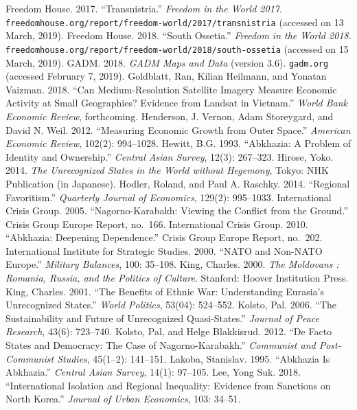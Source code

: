 \documentclass[12pt,a4paper]{article}%
\begin{document}
\begin{thebibliography}{99}
\bibitem{} Freedom House. 2017. ``Transnistria.'' \textit{Freedom in the World 2017}. \verb!freedomhouse.org/report/freedom-world/2017/transnistria! (accessed on 13 March, 2019).
\bibitem{} Freedom House. 2018. ``South Ossetia.'' \textit{Freedom in the World 2018}. \verb!freedomhouse.org/report/freedom-world/2018/south-ossetia! (accessed on 15 March, 2019).
\bibitem{} GADM. 2018. \textit{GADM Maps and Data} (version 3.6). \verb!gadm.org! (accessed February 7, 2019).
\bibitem{} Goldblatt, Ran, Kilian Heilmann, and Yonatan Vaizman. 2018. ``Can Medium-Resolution Satellite Imagery Measure Economic Activity at Small Geographies? Evidence from Landsat in Vietnam.'' \textit{World Bank Economic Review}, forthcoming.
\bibitem{} Henderson, J. Vernon, Adam Storeygard, and David N. Weil. 2012. ``Measuring Economic Growth from Outer Space.'' \textit{American Economic Review}, 102(2): 994--1028.
\bibitem{} Hewitt, B.G. 1993. ``Abkhazia: A Problem of Identity and Ownership.'' \textit{Central Asian Survey}, 12(3): 267--323.
\bibitem{} Hirose, Yoko. 2014. \textit{The Unrecognized States in the World without Hegemony}, Tokyo: NHK Publication (in Japanese). 
\bibitem{} Hodler, Roland, and Paul A. Raschky. 2014. ``Regional Favoritism.'' \textit{Quarterly Journal of Economics}, 129(2): 995--1033.
\bibitem{} International Crisis Group. 2005. ``Nagorno-Karabakh: Viewing the Conflict from the Ground.'' Crisis Group Europe Report, no.\ 166.
\bibitem{} International Crisis Group. 2010. ``Abkhazia: Deepening Dependence.'' Crisis Group Europe Report, no.\ 202. 
\bibitem{} International Institute for Strategic Studies. 2000. ``NATO and Non-NATO Europe.'' \textit{Military Balances}, 100: 35--108.
\bibitem{} King, Charles. 2000. \textit{The Moldovans : Romania, Russia, and the Politics of Culture}. Stanford: Hoover Institution Press.
\bibitem{} King, Charles. 2001. ``The Benefits of Ethnic War: Understanding Eurasia's Unrecognized States.'' \textit{World Politics}, 53(04): 524--552.
\bibitem{} Kolsto, Pal. 2006. ``The Sustainability and Future of Unrecognized Quasi-States.'' \textit{Journal of Peace Research}, 43(6): 723--740.
\bibitem{} Kolsto, Pal, and Helge Blakkisrud. 2012. ``De Facto States and Democracy: The Case of Nagorno-Karabakh.'' \textit{Communist and Post-Communist Studies}, 45(1--2): 141--151.
\bibitem{} Lakoba, Stanislav. 1995. ``Abkhazia Is Abkhazia.'' \textit{Central Asian Survey}, 14(1): 97--105.
\bibitem{} Lee, Yong Suk. 2018. ``International Isolation and Regional Inequality: Evidence from Sanctions on North Korea.'' \textit{Journal of Urban Economics}, 103: 34--51.

\end{thebibliography}
\end{document}
